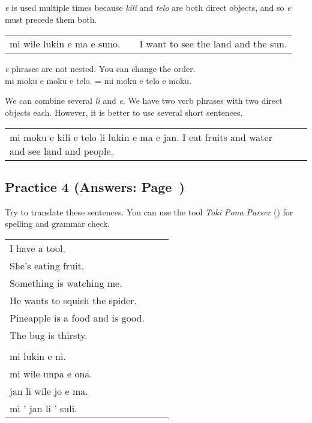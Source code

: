 \textit{e} is used multiple times because \textit{kili} and \textit{telo} are both direct objects, and so \textit{e} must precede them both. 

\begin{supertabular}{p{5,5cm}|ll}
mi wile lukin e ma e suno. && I want to see the land and the sun. \\
\end{supertabular} 
\textit{e} phrases are not nested. You can change the order. \\
mi moku e moku e telo. = mi moku e telo e moku. 

We can combine several \textit{li} and \textit{e}.
We have two verb phrases with two direct objects each. 
However, it is better to use several short sentences. 

\begin{supertabular}{p{5,5cm}|ll}
mi moku e kili e telo li lukin e ma e jan. I eat fruits and water and see land and people. \\
\end{supertabular} 
%
\newpage
\subsection*{Practice 4 (Answers: Page~\pageref{'direct_objects_compund_sentences'})}
%
Try to translate these sentences. 
You can use the tool \textit{Toki Pona Parser} (\cite{www:rowa:02}) for spelling and grammar check. 


\begin{supertabular}{p{5,5cm}|ll}
I have a tool. &&  \\ %
She's eating fruit. &&  \\ %
Something is watching me. &&  \\ %
He wants to squish the spider. &&  \\ %
Pineapple is a food and is good. &&  \\ %
The bug is thirsty. && \\ %
  && \\ %
mi lukin e ni. &&  \\ %
mi wile unpa e ona. &&   \\ %
jan li wile jo e ma. &&  \\ %
mi ' jan li ' suli. &&  \\ %
\end{supertabular} 
